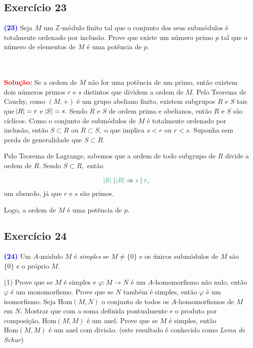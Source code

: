 \documentclass[11pt,a4paper]{article}
\newcommand{\exercicio}[1]{\subsection{Exercício #1} \textcolor{blue}{\bf(#1)}}
\newcommand{\dividiritens}[1]{\begin{tasks}[counter-format={(tsk[a])},label-width=3.6ex, label-format = {\bfseries}, column-sep = {0pt}](1) #1 \end{tasks}}
\newcommand{\pers}[1]{\textcolor{Floresta}{$\negrito{(#1)} $}}
\newcommand{\solucao}[1]{
\textbf{\textcolor{white}{oi}\\ \\ \textcolor{red}{Solução:}} #1}
\begin{document}
\exercicio{23} Seja $M$ um $\mathbb{Z}$-módulo finito tal que o conjunto dos seus submódulos é totalmente ordenado por
inclusão. Prove que existe um número primo $p$ tal que o número de elementos de $M$ é uma potência de $p.$
\solucao{
Se a ordem de $M$ não for uma potência de um primo, então existem dois números primos $r$ e $s$ distintos que dividem a ordem de $M.$ Pelo Teorema de Cauchy, como $(M, +)$ é um grupo abeliano finito, existem subgrupos $R$ e $S$ tais que $\abs{R} = r$ e $\abs{S} = s.$ Sendo $R$ e $S$ de ordem prima e abelianos, então $R$ e $S$ são cíclicos. Como o conjunto de submódulos de $M$ é totalmente ordenado por inclusão, então $S \subset R$ ou $R \subset S,$ o que implica $s < r$ ou $r < s.$ Suponha sem perda de generalidade que $S \subset R.$ 

Pelo Teorema de Lagrange, sabemos que a ordem de todo subgrupo de $R$ divide a ordem de $R.$ Sendo $S \subset R,$ então 

\[\textcolor{Green}{\abs{S}} \mid \textcolor{Green}{\abs{R}} \Rightarrow \textcolor{Green}{s} \mid \textcolor{Green}{r},\]
um absurdo, já que $r$ e $s$ são primos.

Logo, a ordem de $M$ é uma potência de $p.$
}
\exercicio{24} Um $A$-módulo $M$ é \emph{simples} se $M \neq \{0\}$ e os únicos submódulos de $M$ são $\{ 0\}$ e o próprio $M.$
\dividiritens{
\task[\pers{a}] Prove que se $M$ é simples e $\varphi \colon M \to N$ é um $A$-homomorfismo não nulo, então $\varphi$ é um
monomorfismo. Prove que se $N$ também é simples, então $\varphi$ é um isomorfismo.
\task[\pers{b}]  Seja $\mbox{Hom}(M, N)$ o conjunto de todos os $A$-homomorfismos de $M$ em $N.$ Mostrar que com a
soma definida pontualmente e o produto por composição, $\mbox{Hom}(M, M)$ é um anel. Prove que se $M$ é simples, então $\mbox{Hom}(M, M)$ é um anel com divisão. (este resultado é conhecido como
\emph{Lema de Schur})
}
\end{document}
